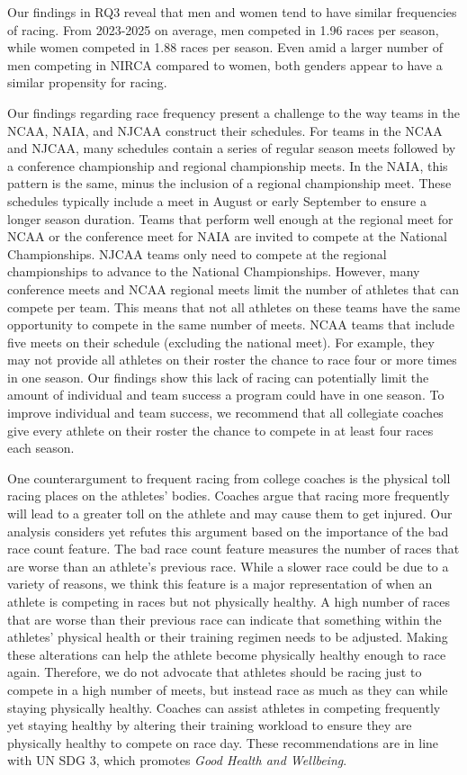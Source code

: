 \documentclass[suppldata]{interact}
\theoremstyle{plain}%
\theoremstyle{definition}
\theoremstyle{remark}
\begin{document}
Our findings in RQ3 reveal that men and women tend to have similar frequencies of racing. From 2023-2025 on average, men competed in 1.96 races per season, while women competed in 1.88 races per season. Even amid a larger number of men competing in NIRCA compared to women, both genders appear to have a similar propensity for racing.

Our findings regarding race frequency present a challenge to the way teams in the NCAA, NAIA, and NJCAA construct their schedules. For teams in the NCAA and NJCAA, many schedules contain a series of regular season meets followed by a conference championship and regional championship meets. In the NAIA, this pattern is the same, minus the inclusion of a regional championship meet. These schedules typically include a meet in August or early September to ensure a longer season duration. Teams that perform well enough at the regional meet for NCAA or the conference meet for NAIA are invited to compete at the National Championships. NJCAA teams only need to compete at the regional championships to advance to the National Championships. However, many conference meets and NCAA regional meets limit the number of athletes that can compete per team. This means that not all athletes on these teams have the same opportunity to compete in the same number of meets. NCAA teams that include five meets on their schedule (excluding the national meet). For example, they may not provide all athletes on their roster the chance to race four or more times in one season. Our findings show this lack of racing can potentially limit the amount of individual and team success a program could have in one season. To improve individual and team success, we recommend that all collegiate coaches give every athlete on their roster the chance to compete in at least four races each season.

One counterargument to frequent racing from college coaches is the physical toll racing places on the athletes' bodies. Coaches argue that racing more frequently will lead to a greater toll on the athlete and may cause them to get injured. Our analysis considers yet refutes this argument based on the importance of the bad race count feature. The bad race count feature measures the number of races that are worse than an athlete's previous race. While a slower race could be due to a variety of reasons, we think this feature is a major representation of when an athlete is competing in races but not physically healthy.  A high number of races that are worse than their previous race can indicate that something within the athletes' physical health or their training regimen needs to be adjusted.  Making these alterations can help the athlete become physically healthy enough to race again.  Therefore, we do not advocate that athletes should be racing just to compete in a high number of meets, but instead race as much as they can while staying physically healthy. Coaches can assist athletes in competing frequently yet staying healthy by altering their training workload to ensure they are physically healthy to compete on race day. These recommendations are in line with UN SDG 3, which promotes \textit{Good Health and Wellbeing}.
\end{document}
